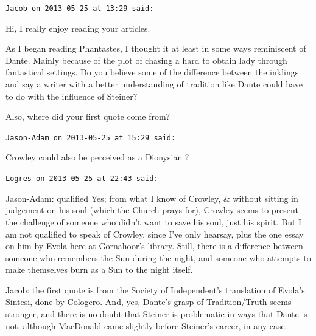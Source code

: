 \begin{footnotesize}
\begin{sffamily}
\texttt{Jacob on 2013-05-25 at 13:29 said:}

Hi, I really enjoy reading your articles.

As I began reading Phantastes, I thought it at least in some ways reminiscent of Dante. Mainly because of the plot of chasing a hard to obtain lady through fantastical settings. Do you believe some of the difference between the inklings and say a writer with a better understanding of tradition like Dante could have to do with the influence of Steiner?

Also, where did your first quote come from?

\hfill

\texttt{Jason-Adam on 2013-05-25 at 15:29 said:}

Crowley could also be perceived as a Dionysian ?

\hfill

\texttt{Logres on 2013-05-25 at 22:43 said:}

Jason-Adam: qualified Yes; from what I know of Crowley, \& without sitting in judgement on his soul (which the Church prays for), Crowley seems to present the challenge of someone who didn't want to save his soul, just his spirit. But I am not qualified to speak of Crowley, since I've only hearsay, plus the one essay on him by Evola here at Gornahoor's library. Still, there is a difference between someone who remembers the Sun during the night, and someone who attempts to make themselves burn as a Sun to the night itself.

Jacob: the first quote is from the Society of Independent's translation of Evola's Sintesi, done by Cologero. And, yes, Dante's grasp of Tradition/Truth seems stronger, and there is no doubt that Steiner is problematic in ways that Dante is not, although MacDonald came slightly before Steiner's career, in any case.

\hfill

\end{sffamily}
\end{footnotesize}

